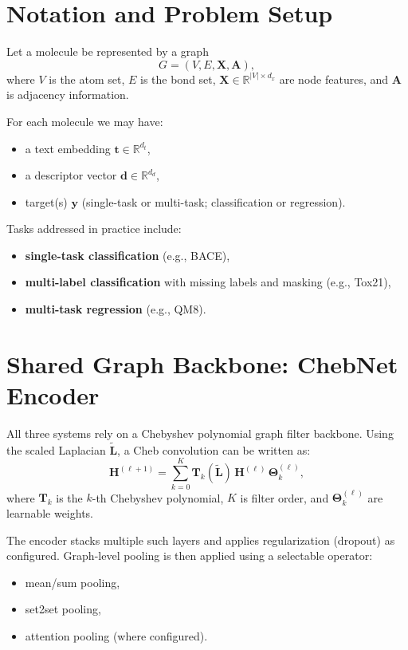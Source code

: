 \documentclass[11pt,a4paper]{article}
\begin{document}
\section{Notation and Problem Setup}
Let a molecule be represented by a graph
\begin{equation}
G = (V, E, \mathbf{X}, \mathbf{A}),
\end{equation}
where $V$ is the atom set, $E$ is the bond set, $\mathbf{X} \in \mathbb{R}^{|V| \times d_x}$ are node features, and $\mathbf{A}$ is adjacency information.

For each molecule we may have:
\begin{itemize}
    \item a text embedding $\mathbf{t} \in \mathbb{R}^{d_t}$,
    \item a descriptor vector $\mathbf{d} \in \mathbb{R}^{d_d}$,
    \item target(s) $\mathbf{y}$ (single-task or multi-task; classification or regression).
\end{itemize}

Tasks addressed in practice include:
\begin{itemize}
    \item \textbf{single-task classification} (e.g., BACE),
    \item \textbf{multi-label classification} with missing labels and masking (e.g., Tox21),
    \item \textbf{multi-task regression} (e.g., QM8).
\end{itemize}

\section{Shared Graph Backbone: ChebNet Encoder}
All three systems rely on a Chebyshev polynomial graph filter backbone. Using the scaled Laplacian $\tilde{\mathbf{L}}$, a Cheb convolution can be written as:
\begin{equation}
\mathbf{H}^{(\ell+1)} = \sum_{k=0}^{K} \mathbf{T}_k(\tilde{\mathbf{L}})\,\mathbf{H}^{(\ell)}\,\mathbf{\Theta}_k^{(\ell)},
\end{equation}
where $\mathbf{T}_k$ is the $k$-th Chebyshev polynomial, $K$ is filter order, and $\mathbf{\Theta}_k^{(\ell)}$ are learnable weights.

The encoder stacks multiple such layers and applies regularization (dropout) as configured. Graph-level pooling is then applied using a selectable operator:
\begin{itemize}
    \item mean/sum pooling,
    \item set2set pooling,
    \item attention pooling (where configured).
\end{itemize}
\end{document}
